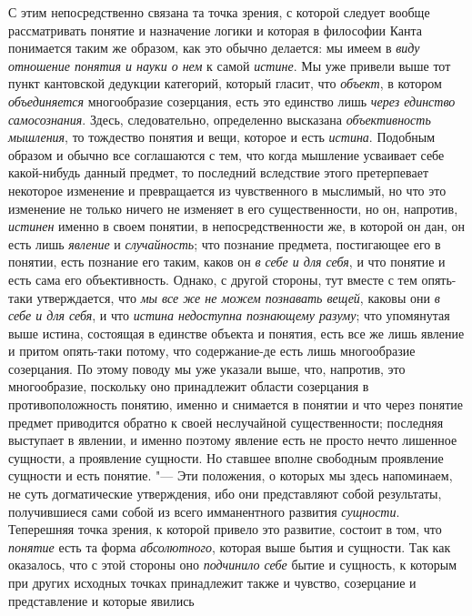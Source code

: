 {С этим непосредственно связана та точка зрения, с которой
следует вообще рассматривать понятие и назначение логики и которая в
философии Канта понимается таким же образом, как это обычно делается: мы
имеем в {\em виду отношение понятия и
науки о нем} к самой
{\em истине}. Мы уже
привели выше тот пункт кантовской дедукции категорий, который гласит, что
{\em объект}, в котором
{\em объединяется}
многообразие созерцания, есть это единство лишь
{\em через единство самосознания}.
Здесь, следовательно, определенно высказана
{\em объективность мышления},
то тождество понятия и вещи, которое и есть
{\em истина}. Подобным
образом и обычно все соглашаются с тем, что когда мышление усваивает себе
какой-нибудь данный предмет, то последний вследствие этого претерпевает
некоторое изменение и превращается из чувственного в мыслимый, но что это
изменение не только ничего не изменяет в его существенности, но он,
напротив, {\em истинен}
именно в своем понятии, в непосредственности же, в которой он
дан, он есть лишь {\em явление}
и {\em случайность};
что познание предмета, постигающее его в понятии, есть
познание его таким, каков он {\em в себе
и для себя}, и что понятие и есть сама его объективность.
Однако, с другой стороны, тут вместе с тем опять-таки
утверждается,
что {\em мы все же не
можем познавать вещей}, каковы они
{\em в себе и для себя},
и что {\em истина
недоступна познающему разуму}; что упомянутая выше
истина, состоящая в единстве объекта и понятия, есть все же
лишь явление и притом опять-таки потому, что содержание-де есть лишь
многообразие созерцания. По этому поводу мы уже указали выше, что,
напротив, это многообразие, поскольку оно принадлежит области созерцания в
противоположность понятию, именно и снимается в понятии и что через понятие
предмет приводится обратно к своей неслучайной существенности; последняя
выступает в явлении, и именно поэтому явление есть не просто нечто лишенное
сущности, а проявление сущности. Но ставшее вполне свободным проявление
сущности и есть понятие. "--- Эти положения, о которых мы здесь
напоминаем, не суть догматические утверждения, ибо они представляют собой
результаты, получившиеся сами собой из всего имманентного развития
{\em сущности}.
Теперешняя точка зрения, к которой привело это развитие,
состоит в том, что {\em понятие}
есть та форма
{\em абсолютного},
которая выше бытия и сущности. Так как оказалось, что с этой
стороны оно {\em подчинило себе}
бытие и сущность, к которым при других исходных точках
принадлежит также и чувство, созерцание и представление и которые явились
}
